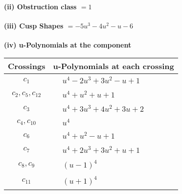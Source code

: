 \documentclass[1p]{elsarticle_modified}
\theoremstyle{definition}
\begin{document}
\flushleft \textbf{(ii) Obstruction class $= 1$}\\~\\
\flushleft \textbf{(iii) Cusp Shapes $= -5 u^3-4 u^2- u-6$}\\~\\
\newpage\renewcommand{\arraystretch}{1}
\flushleft \textbf{(iv) u-Polynomials at the component}\newline \\
\begin{tabular}{m{50pt}|m{274pt}}
Crossings & \hspace{64pt}u-Polynomials at each crossing \\
\hline $$\begin{aligned}c_{1}\end{aligned}$$&$\begin{aligned}
&u^4-2 u^3+3 u^2- u+1
\end{aligned}$\\
\hline $$\begin{aligned}c_{2},c_{5},c_{12}\end{aligned}$$&$\begin{aligned}
&u^4+u^2+u+1
\end{aligned}$\\
\hline $$\begin{aligned}c_{3}\end{aligned}$$&$\begin{aligned}
&u^4+3 u^3+4 u^2+3 u+2
\end{aligned}$\\
\hline $$\begin{aligned}c_{4},c_{10}\end{aligned}$$&$\begin{aligned}
&u^4
\end{aligned}$\\
\hline $$\begin{aligned}c_{6}\end{aligned}$$&$\begin{aligned}
&u^4+u^2- u+1
\end{aligned}$\\
\hline $$\begin{aligned}c_{7}\end{aligned}$$&$\begin{aligned}
&u^4+2 u^3+3 u^2+u+1
\end{aligned}$\\
\hline $$\begin{aligned}c_{8},c_{9}\end{aligned}$$&$\begin{aligned}
&(u-1)^4
\end{aligned}$\\
\hline $$\begin{aligned}c_{11}\end{aligned}$$&$\begin{aligned}
&(u+1)^4
\end{aligned}$\\
\hline
\end{tabular}\\~\\
\end{document}
